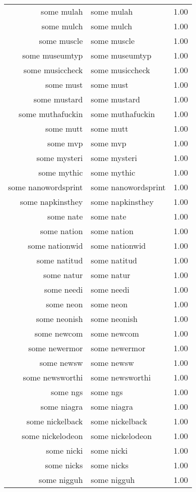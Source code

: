 \begin{table}[ht]
\begin{tabular}{rlr}
  some mulah & some mulah & 1.00 \\ 
  some mulch & some mulch & 1.00 \\ 
  some muscle & some muscle & 1.00 \\ 
  some museumtyp & some museumtyp & 1.00 \\ 
  some musiccheck & some musiccheck & 1.00 \\ 
  some must & some must & 1.00 \\ 
  some mustard & some mustard & 1.00 \\ 
  some muthafuckin & some muthafuckin & 1.00 \\ 
  some mutt & some mutt & 1.00 \\ 
  some mvp & some mvp & 1.00 \\ 
  some mysteri & some mysteri & 1.00 \\ 
  some mythic & some mythic & 1.00 \\ 
  some nanowordsprint & some nanowordsprint & 1.00 \\ 
  some napkinsthey & some napkinsthey & 1.00 \\ 
  some nate & some nate & 1.00 \\ 
  some nation & some nation & 1.00 \\ 
  some nationwid & some nationwid & 1.00 \\ 
  some natitud & some natitud & 1.00 \\ 
  some natur & some natur & 1.00 \\ 
  some needi & some needi & 1.00 \\ 
  some neon & some neon & 1.00 \\ 
  some neonish & some neonish & 1.00 \\ 
  some newcom & some newcom & 1.00 \\ 
  some newermor & some newermor & 1.00 \\ 
  some newsw & some newsw & 1.00 \\ 
  some newsworthi & some newsworthi & 1.00 \\ 
  some ngs & some ngs & 1.00 \\ 
  some niagra & some niagra & 1.00 \\ 
  some nickelback & some nickelback & 1.00 \\ 
  some nickelodeon & some nickelodeon & 1.00 \\ 
  some nicki & some nicki & 1.00 \\ 
  some nicks & some nicks & 1.00 \\ 
  some nigguh & some nigguh & 1.00 \\ 

\end{tabular}
\end{table}

